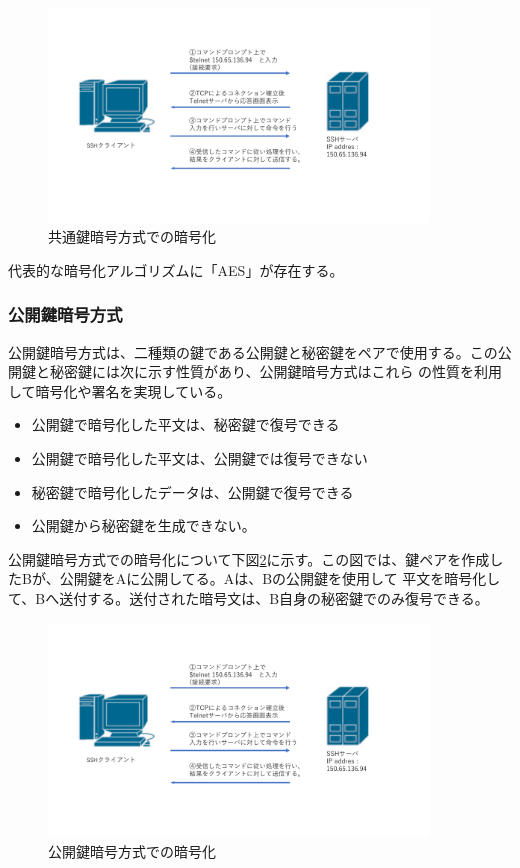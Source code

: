 \documentclass[12pt,a4paper,titlepage]{jsarticle}
\begin{document}
\begin{figure}[h]
    \centering
    \includegraphics[width=0.9\textwidth, page=8]{graphs/network_archtecture.pdf}
    \caption{共通鍵暗号方式での暗号化}
    \label{shared_key}
\end{figure}

代表的な暗号化アルゴリズムに「AES」が存在する。
\subsubsection{公開鍵暗号方式}
公開鍵暗号方式は、二種類の鍵である公開鍵と秘密鍵をペアで使用する。この公開鍵と秘密鍵には次に示す性質があり、公開鍵暗号方式はこれら
の性質を利用して暗号化や署名を実現している。
\begin{itemize}
    \item 公開鍵で暗号化した平文は、秘密鍵で復号できる
    \item 公開鍵で暗号化した平文は、公開鍵では復号できない
    \item 秘密鍵で暗号化したデータは、公開鍵で復号できる
    \item 公開鍵から秘密鍵を生成できない。
\end{itemize}

公開鍵暗号方式での暗号化について下図\ref{public_key}に示す。この図では、鍵ペアを作成したBが、公開鍵をAに公開してる。Aは、Bの公開鍵を使用して
平文を暗号化して、Bへ送付する。送付された暗号文は、B自身の秘密鍵でのみ復号できる。

\begin{figure}[h]
    \centering
    \includegraphics[width=0.9\textwidth, page=9]{graphs/network_archtecture.pdf}
    \caption{公開鍵暗号方式での暗号化}
    \label{public_key}
\end{figure}
\end{document}
